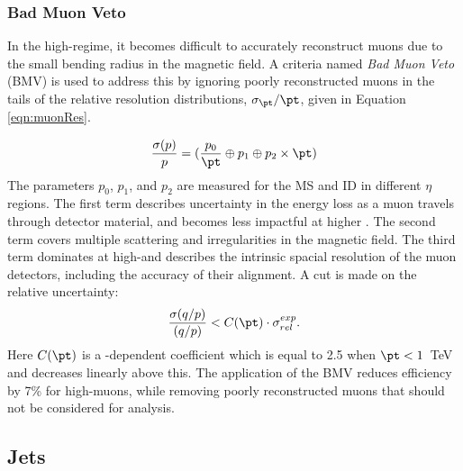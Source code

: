 \subsubsection{Bad Muon Veto}\label{sec:bmv}

In the high-\pt regime, it becomes difficult to accurately reconstruct muons due to the small bending radius in the magnetic field.
A criteria named \emph{Bad Muon Veto} (BMV) is used to address this by ignoring poorly reconstructed muons in the tails of the relative \pt resolution distributions, $\sigma_{\pt}/\pt$, given in Equation \ref{eqn:muonRes}.

\begin{equation}\begin{split}\label{eqn:muonRes}
    \frac{\sigma(p)}{p}=(\frac{p_0}{\pt}\oplus p_1 \oplus p_2\times \pt)
\end{split}\end{equation} 
The parameters $p_0$, $p_1$, and $p_2$ are measured for the MS and ID in different $\eta$ regions. 
The first term describes uncertainty in the energy loss as a muon travels through detector material, and becomes less impactful at higher \pt.
The second term covers multiple scattering and irregularities in the magnetic field.
The third term dominates at high-\pt and describes the intrinsic spacial resolution of the muon detectors, including the accuracy of their alignment. \cite{muonReco}
A cut is made on the relative uncertainty:
\begin{equation}
\frac{\sigma(q/p)}{(q/p)} < C(\pt)\cdot \sigma_{rel}^{exp}.
\end{equation}
Here $C(\pt)$ is a \pt-dependent coefficient which is equal to 2.5 when $\pt<1$~TeV and decreases linearly above this.
The application of the BMV reduces efficiency by 7\% for high-\pt muons, while removing poorly reconstructed muons that should not be considered for analysis.


\subsection{Jets}\label{sec:expJets}

